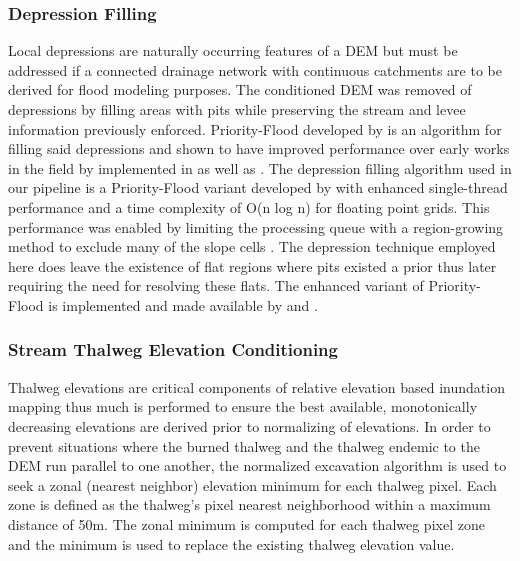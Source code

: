 \subsubsection{Depression Filling}
\label{sssec:depression_filling}
%
Local depressions are naturally occurring features of a DEM but must be addressed if a connected drainage network with continuous catchments are to be derived for flood modeling purposes.
The conditioned DEM was removed of depressions by filling areas with pits while preserving the stream and levee information previously enforced.
Priority-Flood developed by  is an algorithm for filling said depressions and shown to have improved performance over early works in the field by  implemented in  as well as .
The depression filling algorithm used in our pipeline is a Priority-Flood variant developed by \cite{zhou2016efficient} with enhanced single-thread performance and a time complexity of O(n log n) for floating point grids.
This performance was enabled by limiting the processing queue with a region-growing method to exclude many of the slope cells \cite{zhou2016efficient}.
The depression technique employed here does leave the existence of flat regions where pits existed a prior thus later requiring the need for resolving these flats.
The enhanced variant of Priority-Flood is implemented and made available by  and .
%
\subsubsection{Stream Thalweg Elevation Conditioning}
\label{sssec:stream_thalweg_elevation_conditioning}
%
Thalweg elevations are critical components of relative elevation based inundation mapping thus much is performed to ensure the best available, monotonically decreasing elevations are derived prior to normalizing of elevations.
In order to prevent situations where the burned thalweg and the thalweg endemic to the DEM run parallel to one another, the normalized excavation algorithm \cite{saunders1999preparation} is used to seek a zonal (nearest neighbor) elevation minimum for each thalweg pixel. 
Each zone is defined as the thalweg's pixel nearest neighborhood within a maximum distance of 50m.
The zonal minimum is computed for each thalweg pixel zone and the minimum is used to replace the existing thalweg elevation value.

